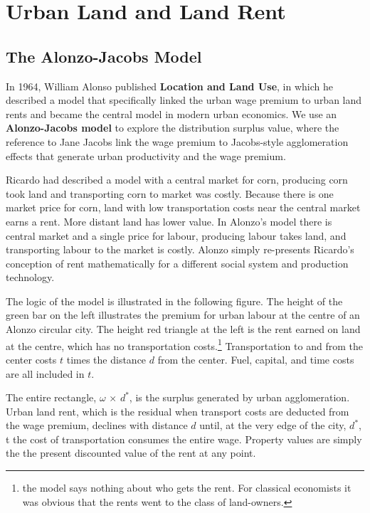 

\chapter{Urban Land and Land Rent}
\section{The Alonzo-Jacobs Model}
In 1964, William Alonso published \textbf{Location and Land Use}, in which he described a model that specifically linked the urban wage premium to urban land rents and  became the central model in modern urban economics. 
We use an \textbf{Alonzo-Jacobs model} to explore the distribution surplus value, where the reference to Jane Jacobs link the wage premium to Jacobs-style  agglomeration effects that generate urban productivity and the wage premium. 

Ricardo had described a model with a central market for corn, producing corn took land and transporting corn to market was costly. Because there is one market price for corn, land with low transportation costs near the central market earns a rent. More distant land has lower value. In Alonzo's model there is central market and a single price for labour, producing labour takes land, and transporting labour to the market is costly. Alonzo simply re-presents Ricardo's conception of rent  mathematically for a different social system and production technology.  

The logic of the model is illustrated in the following figure. The height of the green bar on the left illustrates the premium for urban labour at the centre of an Alonzo circular city. The height red triangle at the left is the rent earned on land at the centre, which has no transportation costs.\footnote{the model says nothing about who gets the rent. For classical economists it was obvious that the rents went to the class of land-owners.} Transportation to and from the center costs $t$ times the distance $d$ from the center. Fuel, capital, and time costs are  all included in $t$. 



The entire rectangle, $\omega$ $\times$ $d^*$, is the surplus generated by urban agglomeration. Urban land rent, which is the residual when transport costs are deducted from the wage premium, declines  with distance $d$ until, at the very edge of the city, $d^*$, t the cost of transportation  consumes the entire wage. Property values are simply the the present discounted value of the rent at any point.

